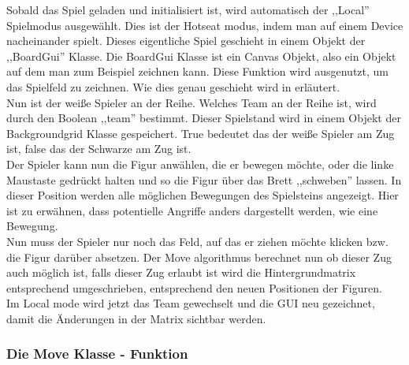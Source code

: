 \documentclass[12pt,a4paper]{article}
\begin{document}
{Sobald das Spiel geladen und initialisiert ist, wird automatisch der ,,Local'' Spielmodus ausgewählt. Dies ist der Hotseat modus, indem man auf einem Device nacheinander spielt. Dieses eigentliche Spiel geschieht in einem Objekt der ,,BoardGui'' Klasse. Die BoardGui Klasse ist ein Canvas Objekt, also ein Objekt auf dem man zum Beispiel zeichnen kann. Diese Funktion wird ausgenutzt, um das Spielfeld zu zeichnen. Wie dies genau geschieht wird in \TODO erläutert.  \\
Nun ist der weiße Spieler an der Reihe. Welches Team an der Reihe ist, wird durch den Boolean ,,team'' bestimmt. Dieser Spielstand wird in einem Objekt der Backgroundgrid Klasse gespeichert. True bedeutet das der weiße Spieler am Zug ist, false das der Schwarze am Zug ist. \\
Der Spieler kann nun die Figur anwählen, die er bewegen möchte, oder die linke Maustaste gedrückt halten und so die Figur über das Brett ,,schweben'' lassen. In dieser Position werden alle möglichen Bewegungen des Spielsteins angezeigt. Hier ist zu erwähnen, dass potentielle Angriffe anders dargestellt werden, wie eine Bewegung. \\
Nun muss der Spieler nur noch das Feld, auf das er ziehen möchte klicken bzw. die Figur darüber absetzen. Der Move algorithmus berechnet nun ob dieser Zug auch möglich ist, falls dieser Zug erlaubt ist wird die Hintergrundmatrix entsprechend umgeschrieben, entsprechend den neuen Positionen der Figuren. \\
Im Local mode wird jetzt das Team gewechselt und die GUI neu gezeichnet, damit die Änderungen in der Matrix sichtbar werden. 

\subsubsection{Die Move Klasse - Funktion}
\label{SUBSUBSEC:MOVE}

}
\end{document}
